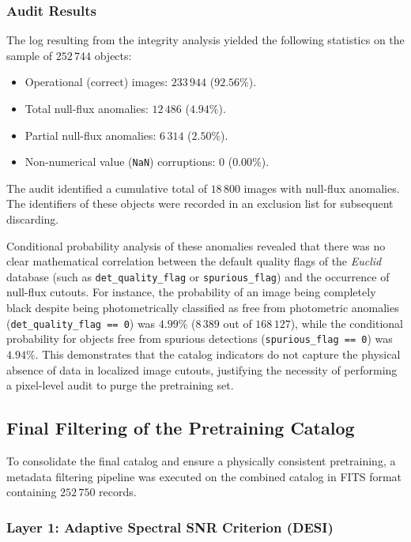 \subsubsection{Audit Results}

The log resulting from the integrity analysis yielded the following statistics on the sample of $252\,744$ objects:

\begin{itemize}
\item Operational (correct) images: $233\,944$ ($92.56\%$).
\item Total null-flux anomalies: $12\,486$ ($4.94\%$).
\item Partial null-flux anomalies: $6\,314$ ($2.50\%$).
\item Non-numerical value (\texttt{NaN}) corruptions: $0$ ($0.00\%$).
\end{itemize}

The audit identified a cumulative total of $18\,800$ images with null-flux anomalies. The identifiers of these objects were recorded in an exclusion list for subsequent discarding.

Conditional probability analysis of these anomalies revealed that there was no clear mathematical correlation between the default quality flags of the \textit{Euclid} database (such as \texttt{det\_quality\_flag} or \texttt{spurious\_flag}) and the occurrence of null-flux cutouts. For instance, the probability of an image being completely black despite being photometrically classified as free from photometric anomalies (\texttt{det\_quality\_flag == 0}) was $4.99\%$ ($8\,389$ out of $168\,127$), while the conditional probability for objects free from spurious detections (\texttt{spurious\_flag == 0}) was $4.94\%$. This demonstrates that the catalog indicators do not capture the physical absence of data in localized image cutouts, justifying the necessity of performing a pixel-level audit to purge the pretraining set.

\subsection{Final Filtering of the Pretraining Catalog}

To consolidate the final catalog and ensure a physically consistent pretraining, a metadata filtering pipeline was executed on the combined catalog in FITS format containing $252\,750$ records.

\subsubsection{Layer 1: Adaptive Spectral SNR Criterion (DESI)}

